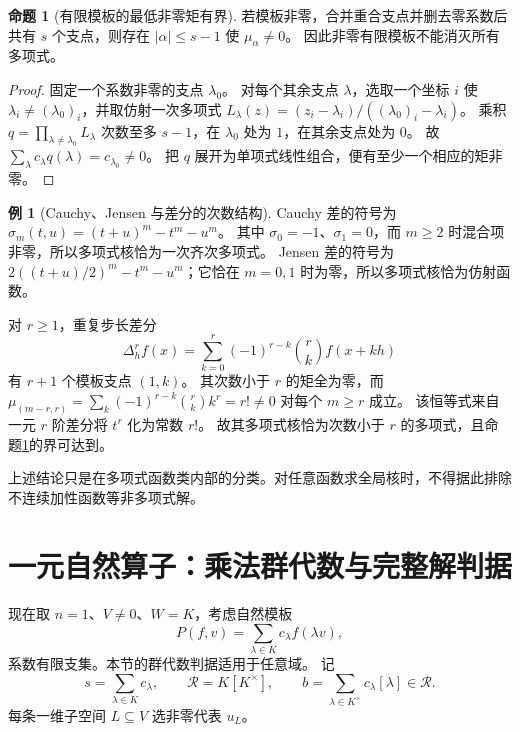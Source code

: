 \documentclass[UTF8,11pt,a4paper]{ctexart}
\theoremstyle{definition}
\newtheorem{proposition}[theorem]{命题}
\newtheorem{example}[theorem]{例}
\numberwithin{equation}{section}
\begin{document}
\begin{proposition}[有限模板的最低非零矩有界]\label{prop:momentbound}
若模板非零，合并重合支点并删去零系数后共有 $s$ 个支点，则存在 $|\alpha|\le s-1$ 使 $\mu_\alpha\ne0$。
因此非零有限模板不能消灭所有多项式。
\end{proposition}
\begin{proof}
固定一个系数非零的支点 $\lambda_0$。
对每个其余支点 $\lambda$，选取一个坐标 $i$ 使 $\lambda_i\ne(\lambda_0)_i$，并取仿射一次多项式
$L_\lambda(z)=(z_i-\lambda_i)/((\lambda_0)_i-\lambda_i)$。
乘积 $q=\prod_{\lambda\ne\lambda_0}L_\lambda$ 次数至多 $s-1$，在 $\lambda_0$ 处为 $1$，在其余支点处为 $0$。
故 $\sum_\lambda c_\lambda q(\lambda)=c_{\lambda_0}\ne0$。
把 $q$ 展开为单项式线性组合，便有至少一个相应的矩非零。
\end{proof}

\begin{example}[Cauchy、Jensen 与差分的次数结构]
Cauchy 差的符号为 $\sigma_m(t,u)=(t+u)^m-t^m-u^m$。
其中 $\sigma_0=-1$、$\sigma_1=0$，而 $m\ge2$ 时混合项非零，所以多项式核恰为一次齐次多项式。
Jensen 差的符号为 $2((t+u)/2)^m-t^m-u^m$；它恰在 $m=0,1$ 时为零，所以多项式核恰为仿射函数。

对 $r\ge1$，重复步长差分
\[
 \Delta_h^r f(x)=\sum_{k=0}^r(-1)^{r-k}\binom rk f(x+kh)
\]
有 $r+1$ 个模板支点 $(1,k)$。
其次数小于 $r$ 的矩全为零，而
$\mu_{(m-r,r)}=\sum_k(-1)^{r-k}\binom rk k^r=r!\ne0$ 对每个 $m\ge r$ 成立。
该恒等式来自一元 $r$ 阶差分将 $t^r$ 化为常数 $r!$。
故其多项式核恰为次数小于 $r$ 的多项式，且命题\ref{prop:momentbound}的界可达到。
\end{example}
上述结论只是在多项式函数类内部的分类。对任意函数求全局核时，不得据此排除不连续加性函数等非多项式解。

\section{一元自然算子：乘法群代数与完整解判据}\label{sec:dilation}
现在取 $n=1$、$V\ne0$、$W=K$，考虑自然模板
\begin{equation}\label{eq:dilation}
 P(f,v)=\sum_{\lambda\in K}c_\lambda f(\lambda v),
\end{equation}
系数有限支集。本节的群代数判据适用于任意域。
记
\[
 s=\sum_{\lambda\in K}c_\lambda,\qquad
 \mathcal R=K[K^\times],\qquad
 b=\sum_{\lambda\in K^\times}c_\lambda[\lambda]\in\mathcal R.
\]
每条一维子空间 $L\subseteq V$ 选非零代表 $u_L$。
\end{document}
